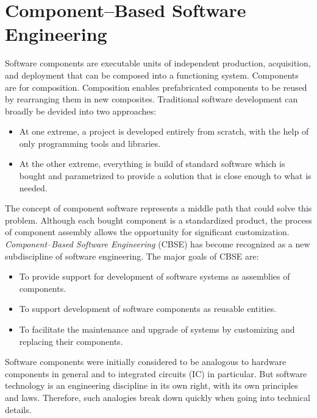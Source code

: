 \section{Component--Based Software Engineering}

Software components are executable units of independent production, acquisition,
and deployment that can be composed into a functioning system.
Components are for composition.
Composition enables prefabricated components to be reused by rearranging them 
in new composites.
Traditional software development can broadly be devided into two approaches:
\begin{itemize}
\item At one extreme, a project is developed entirely from scratch, with the
help of only programming tools and libraries.

\item At the other extreme, everything is build of standard software which
is bought and parametrized to provide a solution that is close enough to what
is needed.
\end{itemize}

\noindent 
The concept of component software represents a middle path that could solve 
this problem.
Although each bought component is a standardized product, the process of
component assembly allows the opportunity for significant customization.
{\it Component--Based Software Engineering} (CBSE) 
\cite{Szyperski02,IVICA2002,CBSE2001}
has become recognized as a new subdiscipline of software engineering. 
The major goals of CBSE are:
\begin{itemize}
\item To provide support for development of software systems as assemblies of
	components.
\item To support development of software components as reusable entities.
\item To facilitate the maintenance and upgrade of systems by customizing
   	and replacing their components.
\end{itemize}

\noindent
Software components were initially considered to be analogous to hardware
components in general and to integrated circuits (IC) in particular.
But software technology is an engineering discipline in its own right, with its
own principles and laws. Therefore, such analogies break down quickly when 
going into technical details.



